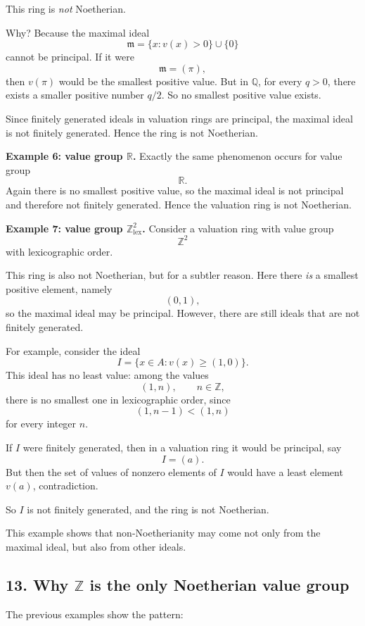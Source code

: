 \documentclass[12pt,a4paper]{article}
\theoremstyle{notespace}
\begin{document}
This ring is \emph{not} Noetherian.

Why? Because the maximal ideal
\[
\mathfrak m=\{x:v(x)>0\}\cup\{0\}
\]
cannot be principal. If it were
\[
\mathfrak m=(\pi),
\]
then \(v(\pi)\) would be the smallest positive value. But in \(\mathbb Q\), for every \(q>0\), there exists a smaller positive number \(q/2\). So no smallest positive value exists.

Since finitely generated ideals in valuation rings are principal, the maximal ideal is not finitely generated. Hence the ring is not Noetherian.

\medskip

\textbf{Example 6: value group \(\mathbb R\).}
Exactly the same phenomenon occurs for value group
\[
\mathbb R.
\]
Again there is no smallest positive value, so the maximal ideal is not principal and therefore not finitely generated. Hence the valuation ring is not Noetherian.

\medskip

\textbf{Example 7: value group \(\mathbb Z^2_{\mathrm{lex}}\).}
Consider a valuation ring with value group
\[
\mathbb Z^2
\]
with lexicographic order.

This ring is also not Noetherian, but for a subtler reason. Here there \emph{is} a smallest positive element, namely
\[
(0,1),
\]
so the maximal ideal may be principal. However, there are still ideals that are not finitely generated.

For example, consider the ideal
\[
I=\{x\in A : v(x)\ge (1,0)\}.
\]
This ideal has no least value: among the values
\[
(1,n),\qquad n\in \mathbb Z,
\]
there is no smallest one in lexicographic order, since
\[
(1,n-1)<(1,n)
\]
for every integer \(n\).

If \(I\) were finitely generated, then in a valuation ring it would be principal, say
\[
I=(a).
\]
But then the set of values of nonzero elements of \(I\) would have a least element \(v(a)\), contradiction.

So \(I\) is not finitely generated, and the ring is not Noetherian.

This example shows that non-Noetherianity may come not only from the maximal ideal, but also from other ideals.

\subsection{13. Why \(\mathbb Z\) is the only Noetherian value group}

The previous examples show the pattern:
\end{document}
